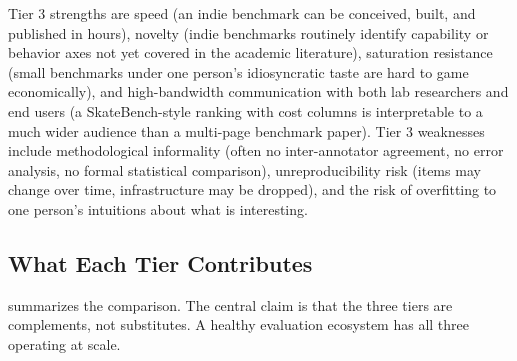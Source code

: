 \documentclass[11pt,a4paper]{article}
\begin{document}
Tier 3 strengths are speed (an indie benchmark can be conceived, built, and published in hours), novelty (indie benchmarks routinely identify capability or behavior axes not yet covered in the academic literature), saturation resistance (small benchmarks under one person's idiosyncratic taste are hard to game economically), and high-bandwidth communication with both lab researchers and end users (a SkateBench-style ranking with cost columns is interpretable to a much wider audience than a multi-page benchmark paper). Tier 3 weaknesses include methodological informality (often no inter-annotator agreement, no error analysis, no formal statistical comparison), unreproducibility risk (items may change over time, infrastructure may be dropped), and the risk of overfitting to one person's intuitions about what is interesting.

\subsection{What Each Tier Contributes}
\label{sec:tiercomparison}

 summarizes the comparison. The central claim is that the three tiers are complements, not substitutes. A healthy evaluation ecosystem has all three operating at scale.
\end{document}
